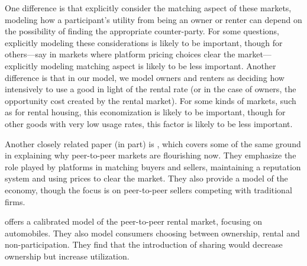 \documentclass[11pt]{article}
\begin{document}
One difference is that \citeauthor{benjaafar2015peer} explicitly consider the matching aspect of these markets, modeling how a participant's utility from being an owner or renter can depend on the possibility of finding the appropriate counter-party.
For some questions, explicitly modeling these considerations is likely to be important, though for others---say in markets where platform pricing choices clear the market---explicitly modeling matching aspect is likely to be less important. 
Another difference is that in our model, we model owners and renters as deciding how intensively to use a good in light of the rental rate (or in the case of owners, the opportunity cost created by the rental market).
For some kinds of markets, such as for rental housing, this economization is likely to be important, though for other goods with very low usage rates, this factor is likely to be less important. 

Another closely related paper (in part) is \cite{einav2015peer}, which covers some of the same ground in explaining why peer-to-peer markets are flourishing now.
They emphasize the role played by platforms in matching buyers and sellers, maintaining a reputation system and using prices to clear the market.
They also provide a model of the economy, though the focus is on peer-to-peer sellers competing with traditional firms. 

\cite{frailberger2015} offers a calibrated model of the peer-to-peer rental market, focusing on automobiles.
They also model consumers choosing between ownership, rental and non-participation.
They find that the introduction of sharing would decrease ownership but increase utilization. 


% 

\end{document}

